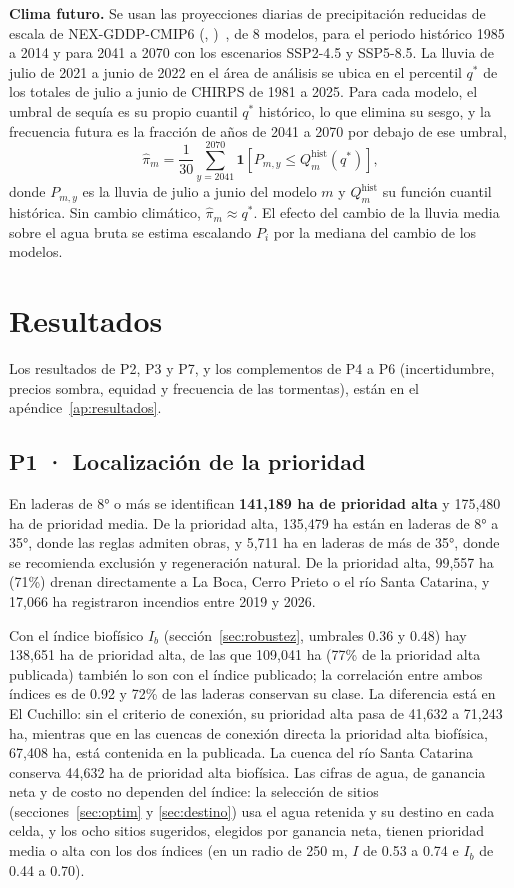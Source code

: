 \documentclass[11pt,letterpaper]{article}
\makeatletter
\newcommand{\citap}[1]{(\@nameuse{cautor@#1}, \@nameuse{canio@#1})~\cite{#1}}
\makeatother
\begin{document}
\textbf{Clima futuro.} Se usan las proyecciones diarias de precipitación reducidas de escala de NEX-GDDP-CMIP6 \citap{thrasher2022}, de 8 modelos, para el periodo histórico 1985 a 2014 y para 2041 a 2070 con los escenarios SSP2-4.5 y SSP5-8.5. La lluvia de julio de 2021 a junio de 2022 en el área de análisis se ubica en el percentil $q^\ast$ de los totales de julio a junio de CHIRPS de 1981 a 2025. Para cada modelo, el umbral de sequía es su propio cuantil $q^\ast$ histórico, lo que elimina su sesgo, y la frecuencia futura es la fracción de años de 2041 a 2070 por debajo de ese umbral,
\begin{equation}
\hat\pi_m=\frac{1}{30}\sum_{y=2041}^{2070}\mathbf 1\!\left[P_{m,y}\le Q_{m}^{\text{hist}}(q^\ast)\right],
\end{equation}
donde $P_{m,y}$ es la lluvia de julio a junio del modelo $m$ y $Q_{m}^{\text{hist}}$ su función cuantil histórica. Sin cambio climático, $\hat\pi_m\approx q^\ast$. El efecto del cambio de la lluvia media sobre el agua bruta se estima escalando $P_i$ por la mediana del cambio de los modelos.

\section{Resultados}

Los resultados de P2, P3 y P7, y los complementos de P4 a P6 (incertidumbre, precios sombra, equidad y frecuencia de las tormentas), están en el apéndice~\ref{ap:resultados}.

\subsection{P1 · Localización de la prioridad}\label{res:p1}

En laderas de 8° o más se identifican \textbf{141,189 ha de prioridad alta} y 175,480 ha de prioridad media. De la prioridad alta, 135,479 ha están en laderas de 8° a 35°, donde las reglas admiten obras, y 5,711 ha en laderas de más de 35°, donde se recomienda exclusión y regeneración natural. De la prioridad alta, 99,557 ha (71\%) drenan directamente a La Boca, Cerro Prieto o el río Santa Catarina, y 17,066 ha registraron incendios entre 2019 y 2026.

Con el índice biofísico $I_b$ (sección~\ref{sec:robustez}, umbrales 0.36 y 0.48) hay 138,651 ha de prioridad alta, de las que 109,041 ha (77\% de la prioridad alta publicada) también lo son con el índice publicado; la correlación entre ambos índices es de 0.92 y 72\% de las laderas conservan su clase. La diferencia está en El Cuchillo: sin el criterio de conexión, su prioridad alta pasa de 41,632 a 71,243 ha, mientras que en las cuencas de conexión directa la prioridad alta biofísica, 67,408 ha, está contenida en la publicada. La cuenca del río Santa Catarina conserva 44,632 ha de prioridad alta biofísica. Las cifras de agua, de ganancia neta y de costo no dependen del índice: la selección de sitios (secciones~\ref{sec:optim} y \ref{sec:destino}) usa el agua retenida y su destino en cada celda, y los ocho sitios sugeridos, elegidos por ganancia neta, tienen prioridad media o alta con los dos índices (en un radio de 250 m, $I$ de 0.53 a 0.74 e $I_b$ de 0.44 a 0.70).
\end{document}
